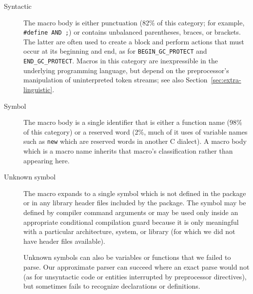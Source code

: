 \documentclass[10pt]{article}
\begin{document}
\begin{description}
\item[Syntactic]  The macro body is either punctuation (82\% of this
  category; for example, {\tt \#define AND ;}) or contains unbalanced
  parentheses, braces, or brackets.  The latter are often used to create a
  block and perform actions that must occur at its beginning and end, as
  for \verb|BEGIN_GC_PROTECT| and \verb|END_GC_PROTECT|.
  Macros in this category are inexpressible in the underlying programming
  language, but depend on the preprocessor's manipulation of uninterpreted
  token streams; see also Section~\ref{sec:extra-linguistic}.


\item[Symbol]
  The macro body is a single identifier that is either a function name
  (98\% of this category) or a reserved word (2\%, much of it uses of
  variable names such as {\tt new} which are reserved words in another
  C dialect).  A macro body which is a macro name inherits that macro's
  classification rather than appearing here.


\item[Unknown symbol]
  The macro expands to a single symbol which is not defined in the package
  or in any library header files included by the package.  The symbol may
  be defined by compiler command arguments or may be used only inside an
  appropriate conditional compilation guard because it is only meaningful
  with a particular architecture, system, or library (for which we did not
  have header files available).
  
  Unknown symbols can also be variables or functions that we failed to
  parse.  Our approximate parser can succeed where an exact parse would not
  (as for unsyntactic code or entities interrupted by preprocessor
  directives), but sometimes fails to recognize declarations or
  definitions.



\end{description}
\end{document}
